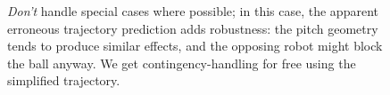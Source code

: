 \documentclass[12pt,a4paper,notitlepage,twocolumn]{report}
\begin{document}
\begin{figure}[htp]
  \begin{center}
  \end{center}
  \caption{\emph{Don’t} handle special cases where possible; in this
    case, the apparent erroneous trajectory prediction adds
    robustness: the pitch geometry tends to produce similar effects,
    and the opposing robot might block the ball anyway. We get
    contingency-handling for free using the simplified trajectory.}
  \label{fig:gui}
\end{figure}
\end{document}

